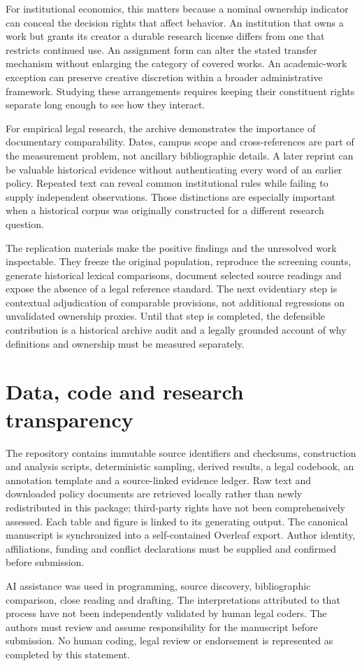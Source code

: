 \documentclass[12pt]{article}
\begin{document}
For institutional economics, this matters because a nominal ownership indicator can conceal the decision rights that affect behavior. An institution that owns a work but grants its creator a durable research license differs from one that restricts continued use. An assignment form can alter the stated transfer mechanism without enlarging the category of covered works. An academic-work exception can preserve creative discretion within a broader administrative framework. Studying these arrangements requires keeping their constituent rights separate long enough to see how they interact.

For empirical legal research, the archive demonstrates the importance of documentary comparability. Dates, campus scope and cross-references are part of the measurement problem, not ancillary bibliographic details. A later reprint can be valuable historical evidence without authenticating every word of an earlier policy. Repeated text can reveal common institutional rules while failing to supply independent observations. Those distinctions are especially important when a historical corpus was originally constructed for a different research question.

The replication materials make the positive findings and the unresolved work inspectable. They freeze the original population, reproduce the screening counts, generate historical lexical comparisons, document selected source readings and expose the absence of a legal reference standard. The next evidentiary step is contextual adjudication of comparable provisions, not additional regressions on unvalidated ownership proxies. Until that step is completed, the defensible contribution is a historical archive audit and a legally grounded account of why definitions and ownership must be measured separately.

\section*{Data, code and research transparency}
The repository contains immutable source identifiers and checksums, construction and analysis scripts, deterministic sampling, derived results, a legal codebook, an annotation template and a source-linked evidence ledger. Raw text and downloaded policy documents are retrieved locally rather than newly redistributed in this package; third-party rights have not been comprehensively assessed. Each table and figure is linked to its generating output. The canonical manuscript is synchronized into a self-contained Overleaf export. Author identity, affiliations, funding and conflict declarations must be supplied and confirmed before submission.

AI assistance was used in programming, source discovery, bibliographic comparison, close reading and drafting. The interpretations attributed to that process have not been independently validated by human legal coders. The authors must review and assume responsibility for the manuscript before submission. No human coding, legal review or endorsement is represented as completed by this statement.

\begingroup{}\small

\endgroup
\end{document}
